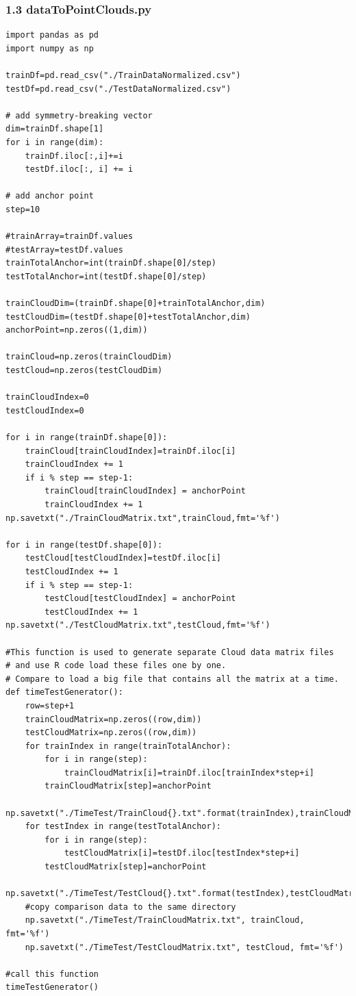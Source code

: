 \documentclass[12pt]{ctexart}
\begin{document}
\subsubsection*{1.3 dataToPointClouds.py}
\begin{scriptsize}
\begin{verbatim}
import pandas as pd
import numpy as np

trainDf=pd.read_csv("./TrainDataNormalized.csv")
testDf=pd.read_csv("./TestDataNormalized.csv")

# add symmetry-breaking vector
dim=trainDf.shape[1]
for i in range(dim):
    trainDf.iloc[:,i]+=i
    testDf.iloc[:, i] += i

# add anchor point
step=10

#trainArray=trainDf.values
#testArray=testDf.values
trainTotalAnchor=int(trainDf.shape[0]/step)
testTotalAnchor=int(testDf.shape[0]/step)

trainCloudDim=(trainDf.shape[0]+trainTotalAnchor,dim)
testCloudDim=(testDf.shape[0]+testTotalAnchor,dim)
anchorPoint=np.zeros((1,dim))

trainCloud=np.zeros(trainCloudDim)
testCloud=np.zeros(testCloudDim)

trainCloudIndex=0
testCloudIndex=0

for i in range(trainDf.shape[0]):
    trainCloud[trainCloudIndex]=trainDf.iloc[i]
    trainCloudIndex += 1
    if i % step == step-1:
        trainCloud[trainCloudIndex] = anchorPoint
        trainCloudIndex += 1
np.savetxt("./TrainCloudMatrix.txt",trainCloud,fmt='%f')

for i in range(testDf.shape[0]):
    testCloud[testCloudIndex]=testDf.iloc[i]
    testCloudIndex += 1
    if i % step == step-1:
        testCloud[testCloudIndex] = anchorPoint
        testCloudIndex += 1
np.savetxt("./TestCloudMatrix.txt",testCloud,fmt='%f')

#This function is used to generate separate Cloud data matrix files
# and use R code load these files one by one.
# Compare to load a big file that contains all the matrix at a time.
def timeTestGenerator():
    row=step+1
    trainCloudMatrix=np.zeros((row,dim))
    testCloudMatrix=np.zeros((row,dim))
    for trainIndex in range(trainTotalAnchor):
        for i in range(step):
            trainCloudMatrix[i]=trainDf.iloc[trainIndex*step+i]
        trainCloudMatrix[step]=anchorPoint
        np.savetxt("./TimeTest/TrainCloud{}.txt".format(trainIndex),trainCloudMatrix,fmt="%f")
    for testIndex in range(testTotalAnchor):
        for i in range(step):
            testCloudMatrix[i]=testDf.iloc[testIndex*step+i]
        testCloudMatrix[step]=anchorPoint
        np.savetxt("./TimeTest/TestCloud{}.txt".format(testIndex),testCloudMatrix,fmt="%f")
    #copy comparison data to the same directory
    np.savetxt("./TimeTest/TrainCloudMatrix.txt", trainCloud, fmt='%f')
    np.savetxt("./TimeTest/TestCloudMatrix.txt", testCloud, fmt='%f')

#call this function
timeTestGenerator()
\end{verbatim}
\end{scriptsize}
\end{document}
